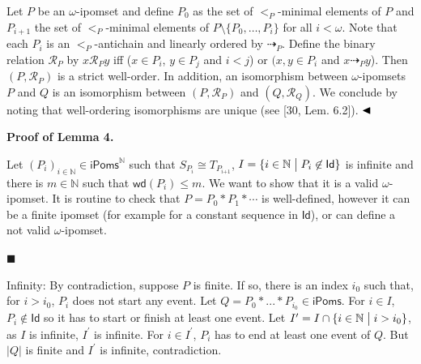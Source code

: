 Let $P$ be an $\omega$-ipomset and define $P_{0}$ as the set of $<_{P}$-minimal elements of $P$ and $P_{i+1}$ the set of $<_{P}$-minimal elements of $P\setminus\{P_{0},\dots,P_{i}\}$ for all $i<\omega$. Note that each $P_{i}$ is an $<_{P}$-antichain and linearly ordered by $\dashrightarrow_{P}$. Define the binary relation $\mathcal{R}_{P}$ by $x\mathcal{R}_{P}y$ iff ($x\in P_{i}$, $y\in P_{j}$ and $i<j$) or $(x,y\in P_{i}$ and $x\dashrightarrow_{P}y$). Then $(P,\mathcal{R}_{P})$ is a strict well-order. In addition, an isomorphism between $\omega$-ipomsets $P$ and $Q$ is an isomorphism between $(P,\mathcal{R}_{P})$ and $(Q,\mathcal{R}_{Q})$. We conclude by noting that well-ordering isomorphisms are unique (see [30, Lem. 6.2]). $\hfill\blacktriangleleft$\par
 
 
 
 
\par\medskip\noindent\textbf{Proof of Lemma 4.}\par
 
 
Let $(P_{i})_{i\in\mathbb{N}}\in\mathsf{iPoms}^{\mathbb{N}}$ such that $S_{P_{i}}\cong T_{P_{i\text{+}1}}$, $I={\{i\in\mathbb{N}\mathrel{\big{|}}P_{i}\not\in\mathsf{Id}\}}$ is infinite and there is $m\in\mathbb{N}$ such that $\mathsf{wd}(P_{i})\leqslant m$. We want to show that it is a valid $\omega$-ipomset. It is routine to check that $P=P_{0}*P_{1}*\cdots$ is well-defined, however it can be a finite ipomset (for example for a constant sequence in $\mathsf{Id}$), or can define a not valid $\omega$-ipomset.\par
  
\par\noindent  $\blacksquare$ 
 
Infinity: By contradiction, suppose $P$ is finite. If so, there is an index $i_{0}$ such that, for $i>i_{0}$, $P_{i}$ does not start any event. Let $Q=P_{0}*...*P_{i_{0}}\in\mathsf{iPoms}$. For $i\in I$, $P_{i}\not\in\mathsf{Id}$ so it has to start or finish at least one event. Let $I^{\prime}=I\cap{\{i\in\mathbb{N}\mathrel{\big{|}}i>i_{0}\}}$, as $I$ is infinite, $I^{\prime}$ is infinite. For $i\in I^{\prime}$, $P_{i}$ has to end at least one event of $Q$. But $|Q|$ is finite and $I^{\prime}$ is infinite, contradiction.\par
 
